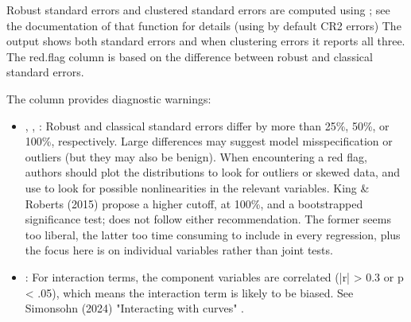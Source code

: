 \documentclass[a4paper]{book}
\begin{document}
%
\begin{Details}
Robust standard errors and clustered standard errors are computed using 
; see the documentation of that function for details (using by default CR2 errors)
The output shows both standard errors and when clustering errors it reports all three.
The red.flag column is based on the difference between robust and classical standard errors.

The  column provides diagnostic warnings:
\begin{itemize}

\item{} \code{!}, \code{!!}, \code{!!!}: Robust and classical standard errors differ by 
more than 25\%, 50\%, or 100\%, respectively. Large differences may suggest model 
misspecification or outliers (but they may also be benign). When encountering a red flag,
authors should plot the distributions to look for outliers or skewed data, and use 
to look for possible nonlinearities in the relevant variables.
King \& Roberts (2015) propose a higher cutoff, at 100\%, and a bootstrapped significance test; 
 does not follow either recommendation. The former seems too liberal, the 
latter too time consuming to include in every regression, plus the focus here is on individual variables rather than joint tests.
\item{} : For interaction terms, the component variables are correlated (|r| > 0.3 or p < .05),
which means the interaction term is likely to be biased. See Simonsohn (2024) "Interacting with curves"
.

\end{itemize}

\end{Details}
%
\end{document}
